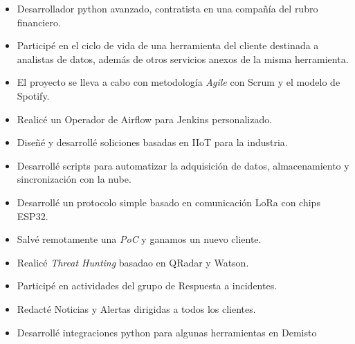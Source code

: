 
\begin{itemize}
  \item Desarrollador python avanzado, contratista en una compañía del rubro financiero.
  \item Participé en el ciclo de vida de una herramienta del cliente destinada a analistas de datos, además de otros servicios anexos de la misma herramienta.
  \item El proyecto se lleva a cabo con metodología {\em Agile} con Scrum y el modelo de \faSpotify Spotify.
  \item \faStar Realicé un Operador de Airflow para Jenkins personalizado. 
\end{itemize}

\divider

\begin{itemize}
  \item Diseñé y desarrollé soliciones basadas en IIoT para la industria.
  \item Desarrollé scripts para automatizar la adquisición de datos, almacenamiento y sincronización con la nube.
  \item Desarrollé un protocolo simple basado en comunicación LoRa con chips ESP32.
  \item \faStar Salvé remotamente una {\em PoC}  y ganamos un nuevo cliente.
\end{itemize}

\divider

\begin{itemize}
  \item Realicé {\it Threat Hunting} basadao en QRadar y Watson.
  \item Participé en actividades del grupo de Respuesta a incidentes.
  \item Redacté Noticias y Alertas dirigidas a todos los clientes.
  \item \faStar Desarrollé integraciones python para algunas herramientas en Demisto
\end{itemize}

